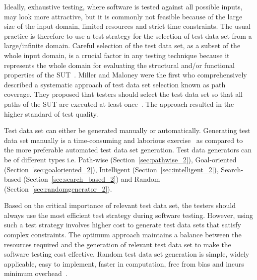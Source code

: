 Ideally, exhaustive testing, where software is tested against all possible inputs, may look more attractive, but it is commonly not feasible because of the large size of the input domain, limited resources and strict time constraints. The usual practice is therefore to use a test strategy for the selection of test data set from a large/infinite domain. Careful selection of the test data set, as a subset of the whole input domain, is a crucial factor in any testing technique because it represents the whole domain for evaluating the structural and/or functional properties of the SUT~\cite{howden1986functional, mccabe1983structured}. Miller and Maloney were the first who comprehensively described a systematic approach of test data set selection known as path coverage. They proposed that testers should select the test data set so that all paths of the SUT are executed at least once~\cite{miller1963systematic}. The approach resulted in the higher standard of test quality. %

Test data set can either be generated manually or automatically. Generating test data set manually is a time-consuming and laborious exercise~\cite{korel1990automated} as compared to the more preferable automated test data set generation. Test data generators can be of different types i.e. Path-wise (Section~\ref{sec:pathwise_2}), Goal-oriented (Section~\ref{sec:goaloriented_2}), Intelligent (Section~\ref{sec:intelligent_2}), Search-based (Section~\ref{sec:search_based_2}) and Random (Section~\ref{sec:randomgenerator_2}).

Based on the critical importance of relevant test data set, the testers should always use the most efficient test strategy during software testing. However, using such a test strategy involves higher cost to generate test data sets that satisfy complex constraints. The optimum approach maintains a balance between the resources required and the generation of relevant test data set to make the software testing cost effective. Random test data set generation is simple, widely applicable, easy to implement, faster in computation, free from bias and incurs minimum overhead~\cite{ciupa2007experimental}. 



